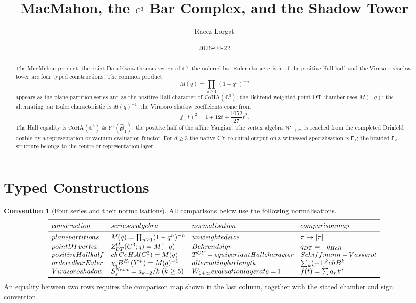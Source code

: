 \documentclass[11pt]{article}
\title{MacMahon, the $\Cthree$ Bar Complex, and the Shadow Tower}
\author{Raeez Lorgat}
\date{2026-04-22}
\theoremstyle{definition}
\newtheorem{convention}[theorem]{Convention}
\theoremstyle{remark}
\newcommand{\Cthree}{\mathbb{C}^{3}}
\newcommand{\CoHA}{\mathrm{CoHA}}
\newcommand{\Yp}{Y^{+}}
\newcommand{\fglone}{\widehat{\mathfrak{gl}}_{1}}
\newcommand{\Winf}{\mathcal{W}_{1+\infty}}
\newcommand{\Eone}{\mathsf{E}_{1}}
\newcommand{\Etwo}{\mathsf{E}_{2}}
\newcommand{\Mac}{M}
\newcommand{\DT}{\mathrm{DT}}
\newcommand{\ch}{\operatorname{ch}}
\begin{document}
\maketitle

\begin{abstract}
The MacMahon product, the point Donaldson-Thomas vertex of $\Cthree$,
the ordered bar Euler characteristic of the positive Hall half, and the
Virasoro shadow tower are four typed constructions. The common product
\[
  \Mac(q)=\prod_{n\geq 1}(1-q^n)^{-n}
\]
appears as the plane-partition series and as the positive Hall
character of $\CoHA(\Cthree)$; the Behrend-weighted point DT chamber
uses $\Mac(-q)$; the alternating bar Euler characteristic is
$\Mac(q)^{-1}$; the Virasoro shadow coefficients come from
\[
  f(t)^2=1+12t+\frac{1052}{27}t^2.
\]
The Hall equality is
$\CoHA(\Cthree)\cong\Yp(\fglone)$, the positive half of the affine
Yangian. The vertex algebra $\Winf$ is reached from the completed
Drinfeld double by a representation or vacuum-evaluation functor. For
$d\geq 3$ the native CY-to-chiral output on a witnessed specialisation
is $\Eone$; the braided
$\Etwo$ structure belongs to the centre or representation layer.
\end{abstract}

\tableofcontents

\section{Typed Constructions}
\label{sec:typed-constructions}

\begin{convention}[Four series and their normalisations]
\label{conv:four-series}
All comparisons below use the following normalisations.
\[
\begin{array}{llll}
\toprule
\textup{construction} & \textup{series or algebra} &
\textup{normalisation} & \textup{comparison map}\\
\midrule
\textup{plane partitions} &
\Mac(q)=\prod_{n\geq1}(1-q^n)^{-n} &
\textup{unweighted size} &
\pi\mapsto|\pi|\\
\textup{point DT vertex} &
Z_{\DT}^{\mathrm{pt}}(\Cthree;q)=\Mac(-q) &
\textup{Behrend sign} &
q_{\DT}=-q_{\mathrm{Hall}}\\
\textup{positive Hall half} &
\ch\,\CoHA(\Cthree)=\Mac(q) &
T^{\mathrm{CY}}\textup{-equivariant Hall character} &
\textup{Schiffmann-Vasserot}\\
\textup{ordered bar Euler} &
\chi_q B^{\Eone}(\Yp)=\Mac(q)^{-1} &
\textup{alternating bar length} &
\sum_k(-1)^k\ch B^k\\
\textup{Virasoro shadow} &
S_k^{\mathrm{Newt}}=a_{k-2}/k\ (k\geq5) &
\Winf\textup{ evaluation layer at }c=1 &
f(t)=\sum a_nt^n\\
\bottomrule
\end{array}
\]
An equality between two rows requires the comparison map shown in the
last column, together with the stated chamber and sign convention.
\end{convention}
\end{document}
